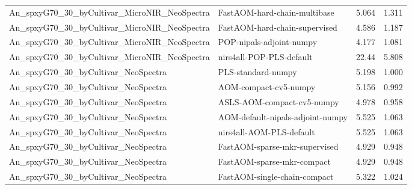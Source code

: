 \begin{landscape}
\begin{longtable}{L{8.0cm}L{9.5cm}rr}
An\_\allowbreak{}spxyG70\_\allowbreak{}30\_\allowbreak{}byCultivar\_\allowbreak{}MicroNIR\_\allowbreak{}NeoSpectra & FastAOM-\allowbreak{}hard-\allowbreak{}chain-\allowbreak{}multibase & 5.064 & 1.311 \\
An\_\allowbreak{}spxyG70\_\allowbreak{}30\_\allowbreak{}byCultivar\_\allowbreak{}MicroNIR\_\allowbreak{}NeoSpectra & FastAOM-\allowbreak{}hard-\allowbreak{}chain-\allowbreak{}supervised & 4.586 & 1.187 \\
An\_\allowbreak{}spxyG70\_\allowbreak{}30\_\allowbreak{}byCultivar\_\allowbreak{}MicroNIR\_\allowbreak{}NeoSpectra & POP-\allowbreak{}nipals-\allowbreak{}adjoint-\allowbreak{}numpy & 4.177 & 1.081 \\
An\_\allowbreak{}spxyG70\_\allowbreak{}30\_\allowbreak{}byCultivar\_\allowbreak{}MicroNIR\_\allowbreak{}NeoSpectra & nirs4all-\allowbreak{}POP-\allowbreak{}PLS-\allowbreak{}default & 22.44 & 5.808 \\
An\_\allowbreak{}spxyG70\_\allowbreak{}30\_\allowbreak{}byCultivar\_\allowbreak{}NeoSpectra & PLS-\allowbreak{}standard-\allowbreak{}numpy & 5.198 & 1.000 \\
An\_\allowbreak{}spxyG70\_\allowbreak{}30\_\allowbreak{}byCultivar\_\allowbreak{}NeoSpectra & AOM-\allowbreak{}compact-\allowbreak{}cv5-\allowbreak{}numpy & 5.156 & 0.992 \\
An\_\allowbreak{}spxyG70\_\allowbreak{}30\_\allowbreak{}byCultivar\_\allowbreak{}NeoSpectra & ASLS-\allowbreak{}AOM-\allowbreak{}compact-\allowbreak{}cv5-\allowbreak{}numpy & 4.978 & 0.958 \\
An\_\allowbreak{}spxyG70\_\allowbreak{}30\_\allowbreak{}byCultivar\_\allowbreak{}NeoSpectra & AOM-\allowbreak{}default-\allowbreak{}nipals-\allowbreak{}adjoint-\allowbreak{}numpy & 5.525 & 1.063 \\
An\_\allowbreak{}spxyG70\_\allowbreak{}30\_\allowbreak{}byCultivar\_\allowbreak{}NeoSpectra & nirs4all-\allowbreak{}AOM-\allowbreak{}PLS-\allowbreak{}default & 5.525 & 1.063 \\
An\_\allowbreak{}spxyG70\_\allowbreak{}30\_\allowbreak{}byCultivar\_\allowbreak{}NeoSpectra & FastAOM-\allowbreak{}sparse-\allowbreak{}mkr-\allowbreak{}supervised & 4.929 & 0.948 \\
An\_\allowbreak{}spxyG70\_\allowbreak{}30\_\allowbreak{}byCultivar\_\allowbreak{}NeoSpectra & FastAOM-\allowbreak{}sparse-\allowbreak{}mkr-\allowbreak{}compact & 4.929 & 0.948 \\
An\_\allowbreak{}spxyG70\_\allowbreak{}30\_\allowbreak{}byCultivar\_\allowbreak{}NeoSpectra & FastAOM-\allowbreak{}single-\allowbreak{}chain-\allowbreak{}compact & 5.322 & 1.024 \\

\end{longtable}
\end{landscape}
